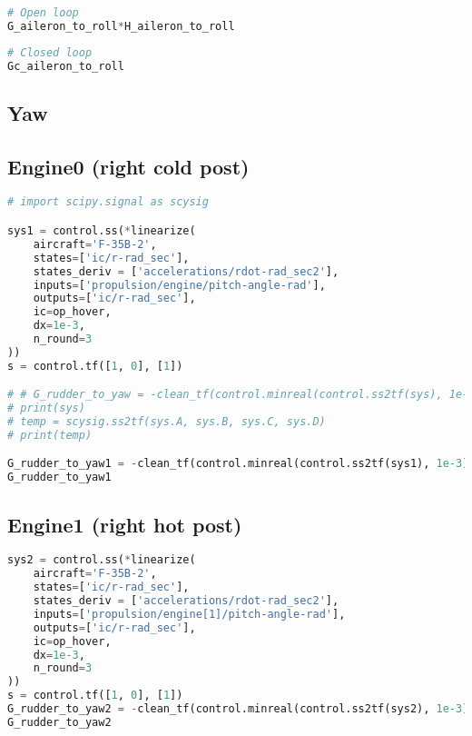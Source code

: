 \begin{lstlisting}[language=Python]
# Open loop 
G_aileron_to_roll*H_aileron_to_roll
\end{lstlisting}

\begin{lstlisting}[language=Python]
# Closed loop 
Gc_aileron_to_roll
\end{lstlisting}

\hypertarget{yaw}{%
\subsection{Yaw}\label{yaw}}

\hypertarget{engine0-right-cold-post}{%
\subsection{Engine0 (right cold post)}\label{engine0-right-cold-post}}

\begin{lstlisting}[language=Python]
# import scipy.signal as scysig

sys1 = control.ss(*linearize(
    aircraft='F-35B-2',
    states=['ic/r-rad_sec'],
    states_deriv = ['accelerations/rdot-rad_sec2'],
    inputs=['propulsion/engine/pitch-angle-rad'],
    outputs=['ic/r-rad_sec'],
    ic=op_hover,
    dx=1e-3,
    n_round=3
))
s = control.tf([1, 0], [1])

# # G_rudder_to_yaw = -clean_tf(control.minreal(control.ss2tf(sys), 1e-3))/s
# print(sys)
# temp = scysig.ss2tf(sys.A, sys.B, sys.C, sys.D)
# print(temp)

G_rudder_to_yaw1 = -clean_tf(control.minreal(control.ss2tf(sys1), 1e-3))/s
G_rudder_to_yaw1
\end{lstlisting}

\hypertarget{engine1-right-hot-post}{%
\subsection{Engine1 (right hot post)}\label{engine1-right-hot-post}}

\begin{lstlisting}[language=Python]
sys2 = control.ss(*linearize(
    aircraft='F-35B-2',
    states=['ic/r-rad_sec'],
    states_deriv = ['accelerations/rdot-rad_sec2'],
    inputs=['propulsion/engine[1]/pitch-angle-rad'],
    outputs=['ic/r-rad_sec'],
    ic=op_hover,
    dx=1e-3,
    n_round=3
))
s = control.tf([1, 0], [1])
G_rudder_to_yaw2 = -clean_tf(control.minreal(control.ss2tf(sys2), 1e-3))/s
G_rudder_to_yaw2
\end{lstlisting}

